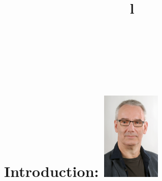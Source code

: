 \documentclass[line,margin,hidelinks]{res}
\begin{document}
\address{
  \href{https://smurp.com}{smurp.com}\\
  Berlin \& Saltspring\\
   \href{https://www.linkedin.com/in/smurp}{linkedin.com/in/smurp}\\
   \href{tel:+49.160.462.8556}{+49.160.462.8556}\\
   {\tt \href{mailto:smurp@smurp.com}{smurp@smurp.com}}}

\resumewidth=7in
\begin{resume}

\begin{format}
\title{l}\\
\\
\body\\
\end{format}


\section{Introduction:
  \newline   \newline
  \includegraphics[width=1.1in]{mugshot.eps}}
\begin{par}


\end{par}
\end{resume}
\end{document}
